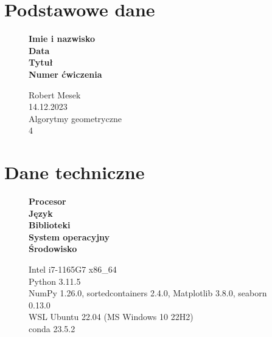 \documentclass[12pt]{article}
\begin{document}
		
		\section*{Podstawowe dane}
		\begin{figure}[htp]
			\begin{minipage}[t]{0.3\textwidth}
				\textbf{Imie i nazwisko} \\
				\textbf{Data} \\
				\textbf{Tytuł} \\
				\textbf{Numer ćwiczenia}
			\end{minipage}%
			\begin{minipage}[t]{0.6\textwidth}
				Robert Mesek \\
				14.12.2023 \\
				Algorytmy geometryczne \\
				4
			\end{minipage}%
		\end{figure}
		
		\section*{Dane techniczne}
		\begin{figure}[htp]
			\begin{minipage}[t]{0.3\textwidth}
				\textbf{Procesor} \\
				\textbf{Język} \\
				\textbf{Biblioteki} \\
				\textbf{System operacyjny} \\
				\textbf{Środowisko}
				
			\end{minipage}%
			\begin{minipage}[t]{0.7\textwidth}
				Intel i7-1165G7 x86\_64 \\
				Python 3.11.5 \\
				NumPy 1.26.0, sortedcontainers 2.4.0, Matplotlib 3.8.0, seaborn 0.13.0 \\
				WSL Ubuntu 22.04 (MS Windows 10 22H2) \\
				conda 23.5.2
			\end{minipage}%
		\end{figure}
		
\end{document}
